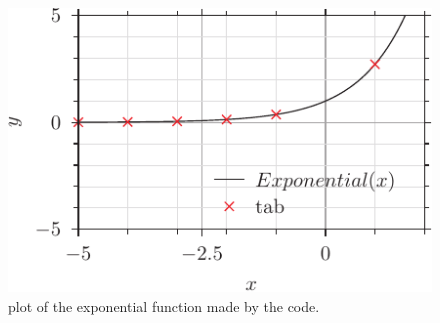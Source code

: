 \documentclass[twocolumn,a4paper,12pt]{article}
\begin{document}
\begin{figure}[t]\label{fig:plot}
    \includegraphics{exp_pyx.pdf}
    \caption{plot of the exponential function made by the code.}
\end{figure}
\end{document}
